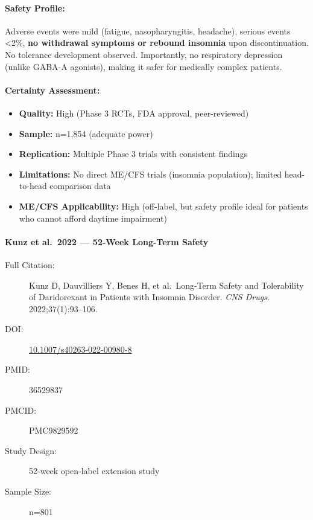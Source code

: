 \paragraph{Safety Profile:}
Adverse events were mild (fatigue, nasopharyngitis, headache), serious events <2\%, \textbf{no withdrawal symptoms or rebound insomnia} upon discontinuation. No tolerance development observed. Importantly, no respiratory depression (unlike GABA-A agonists), making it safer for medically complex patients.

\paragraph{Certainty Assessment:}
\begin{itemize}
    \item \textbf{Quality:} High (Phase 3 RCTs, FDA approval, peer-reviewed)
    \item \textbf{Sample:} n=1,854 (adequate power)
    \item \textbf{Replication:} Multiple Phase 3 trials with consistent findings
    \item \textbf{Limitations:} No direct ME/CFS trials (insomnia population); limited head-to-head comparison data
    \item \textbf{ME/CFS Applicability:} High (off-label, but safety profile ideal for patients who cannot afford daytime impairment)
\end{itemize}

\paragraph{Kunz et al.\ 2022 --- 52-Week Long-Term Safety}

\begin{description}
    \item[Full Citation:] Kunz D, Dauvilliers Y, Benes H, et al.\ Long-Term Safety and Tolerability of Daridorexant in Patients with Insomnia Disorder. \textit{CNS Drugs}. 2022;37(1):93--106.
    \item[DOI:] \href{https://doi.org/10.1007/s40263-022-00980-8}{10.1007/s40263-022-00980-8}
    \item[PMID:] 36529837
    \item[PMCID:] PMC9829592
    \item[Study Design:] 52-week open-label extension study
    \item[Sample Size:] n=801
\end{description}

